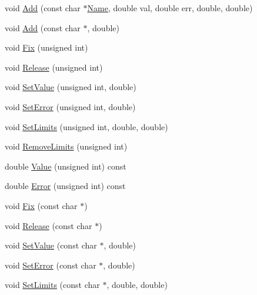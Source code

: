 \begin{DoxyCompactItemize}
void \mbox{\hyperlink{classROOT_1_1Minuit2_1_1MnApplication_afd0879fb1f21d49dd649698c1cd25e50}{Add}} (const char $\ast$\mbox{\hyperlink{classROOT_1_1Minuit2_1_1MnApplication_ad333315ce51772fef3094491b37f309d}{Name}}, double val, double err, double, double)
\item 
void \mbox{\hyperlink{classROOT_1_1Minuit2_1_1MnApplication_a67220ef54f4862a27490162b2f7cf832}{Add}} (const char $\ast$, double)
\item 
void \mbox{\hyperlink{classROOT_1_1Minuit2_1_1MnApplication_a98bea1ca3fb2a311b1c0e72a58ec2d9f}{Fix}} (unsigned int)
\item 
void \mbox{\hyperlink{classROOT_1_1Minuit2_1_1MnApplication_ab690313ed666d5a794a13b05054f5575}{Release}} (unsigned int)
\item 
void \mbox{\hyperlink{classROOT_1_1Minuit2_1_1MnApplication_af6147ded182dfe93c2200d621050c642}{Set\+Value}} (unsigned int, double)
\item 
void \mbox{\hyperlink{classROOT_1_1Minuit2_1_1MnApplication_a04e02c59439b7c638cea29938030b2f8}{Set\+Error}} (unsigned int, double)
\item 
void \mbox{\hyperlink{classROOT_1_1Minuit2_1_1MnApplication_ad6c07174e01b117cb67a43211753ae06}{Set\+Limits}} (unsigned int, double, double)
\item 
void \mbox{\hyperlink{classROOT_1_1Minuit2_1_1MnApplication_a2c99043d2263ae51967867e1a26d4e30}{Remove\+Limits}} (unsigned int)
\item 
double \mbox{\hyperlink{classROOT_1_1Minuit2_1_1MnApplication_a408778c8cf19fe7bdf443a9d51389d66}{Value}} (unsigned int) const
\item 
double \mbox{\hyperlink{classROOT_1_1Minuit2_1_1MnApplication_aedc3775627672ba2038e8a26d6df13f1}{Error}} (unsigned int) const
\item 
void \mbox{\hyperlink{classROOT_1_1Minuit2_1_1MnApplication_aa678010fc292b1d0f4cb1761b13104c4}{Fix}} (const char $\ast$)
\item 
void \mbox{\hyperlink{classROOT_1_1Minuit2_1_1MnApplication_a399bc86275d6ea481911be4a4b48d83c}{Release}} (const char $\ast$)
\item 
void \mbox{\hyperlink{classROOT_1_1Minuit2_1_1MnApplication_af8376fc6c9a727c8f3dbdc268afb0e7e}{Set\+Value}} (const char $\ast$, double)
\item 
void \mbox{\hyperlink{classROOT_1_1Minuit2_1_1MnApplication_ac47d9b0517cbc38dc0237e4dc654a807}{Set\+Error}} (const char $\ast$, double)
\item 
void \mbox{\hyperlink{classROOT_1_1Minuit2_1_1MnApplication_a7c5404de0cf4efac550bea31f3cd4088}{Set\+Limits}} (const char $\ast$, double, double)

\end{DoxyCompactItemize}

